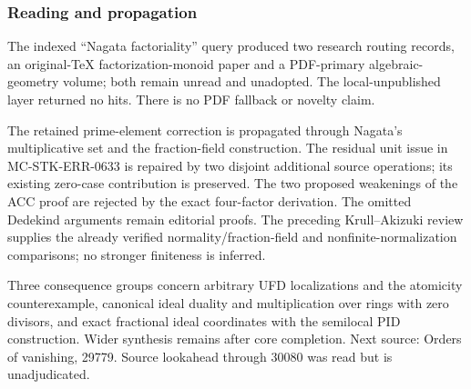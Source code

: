 \subsubsection{Reading and propagation}\label{reading-and-propagation}

The indexed ``Nagata factoriality'' query produced two research routing records, an original-TeX factorization-monoid paper and a PDF-primary algebraic-geometry volume; both remain unread and unadopted. The local-unpublished layer returned no hits. There is no PDF fallback or novelty claim.

The retained prime-element correction is propagated through Nagata's multiplicative set and the fraction-field construction. The residual unit issue in MC-STK-ERR-0633 is repaired by two disjoint additional source operations; its existing zero-case contribution is preserved. The two proposed weakenings of the ACC proof are rejected by the exact four-factor derivation. The omitted Dedekind arguments remain editorial proofs. The preceding Krull--Akizuki review supplies the already verified normality/fraction-field and nonfinite-normalization comparisons; no stronger finiteness is inferred.

Three consequence groups concern arbitrary UFD localizations and the atomicity counterexample, canonical ideal duality and multiplication over rings with zero divisors, and exact fractional ideal coordinates with the semilocal PID construction. Wider synthesis remains after core completion. Next source: Orders of vanishing, 29779. Source lookahead through 30080 was read but is unadjudicated.
